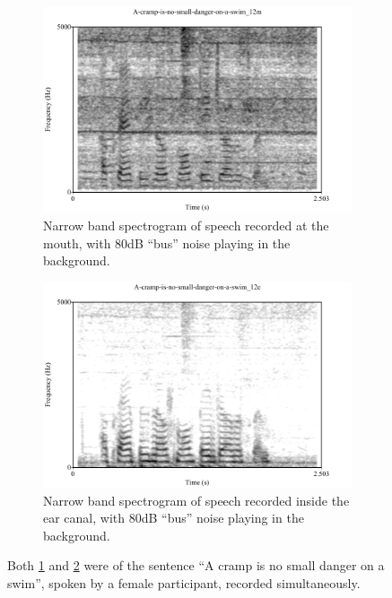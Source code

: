 \documentclass[dissertation,copyright]{uathesis}
\begin{document}
\begin{figure}
\centering
\begin{subfigure}{0.475\textwidth}
  \centering
  \includegraphics[width=1\linewidth]{figure/spctgrmNarrowMthNoise_35.pdf}
  \caption{Narrow band spectrogram of speech recorded at the mouth, with 80dB ``bus'' noise playing in the background.}
  \label{spctgrmNarrowMouthNoise_35}
\end{subfigure}%
\hfill
\begin{subfigure}{0.475\textwidth}
  \centering
  \includegraphics[width=1\linewidth]{figure/spctgrmNarrowEarNoise_35.pdf}
  \caption{Narrow band spectrogram of speech recorded inside the ear canal, with 80dB ``bus'' noise playing in the background.}
  \label{spctgrmNarrowEarNoise_35}
\end{subfigure}
\caption{Both \ref{spctgrmNarrowMouthNoise_35} and \ref{spctgrmNarrowEarNoise_35} were of the sentence ``A cramp is no small danger on a swim'', spoken by a female participant, recorded simultaneously.}
\label{fig:noise_mth_ear}
\end{figure}
\end{document}
